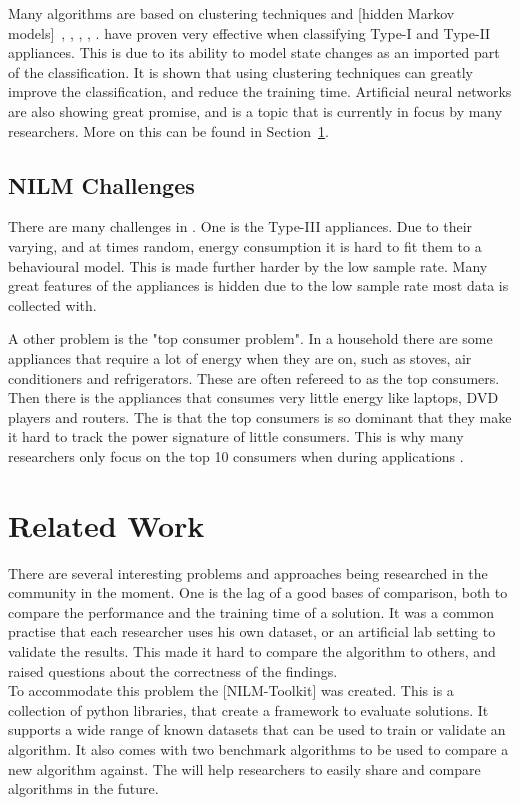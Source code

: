 Many algorithms are based on clustering techniques and [hidden Markov models]~\citep{RefWorks:28}, \citep{RefWorks:26}, \citep{RefWorks:23}, \citep{RefWorks:17}, \citep{RefWorks:24}.  have proven very effective when classifying Type-I and Type-II appliances. This is due to its ability to model state changes as an imported part of the classification. It is shown that using clustering techniques can greatly improve the classification, and reduce the training time. Artificial neural networks are also showing great promise, and is a topic that is currently in focus by many researchers. More on this can be found in Section~\ref{sec:RecRelatedwork}. 

\subsection{NILM Challenges} 
There are many challenges in . One is the Type-III appliances. Due to their varying, and at times random, energy consumption it is hard to fit them to a behavioural model. This is made further harder by the low sample rate. Many great features of the appliances is hidden due to the low sample rate most data is collected with\citep{RefWorks:17}.

A other problem is the "top consumer problem". In a household there are some appliances that require a lot of energy when they are on, such as stoves, air conditioners and refrigerators. These are often refereed to as the top consumers. Then there is the appliances that consumes very little energy like laptops, DVD players and routers. The  is that the top consumers is so dominant that they make it hard to track the power signature of little consumers. This is why many researchers only focus on the top 10 consumers when during  applications \citep{RefWorks:21}. 

\section{Related Work} 
\label{sec:RecRelatedwork}

There are several interesting problems and approaches being researched in the  community in the moment. One is the lag of a good bases of comparison, both to compare the performance and the training time of a solution. It was a common practise that each researcher uses his own dataset, or an artificial lab setting to validate the results. This made it hard to compare the algorithm to others, and raised questions about the correctness of the findings. \\
To accommodate this problem the [NILM-Toolkit] was created. This is a collection of python libraries, that create a framework to evaluate  solutions. It supports a wide range of known datasets that can be used to train or validate an algorithm. It also comes with two benchmark algorithms to be used to compare a new algorithm against. The  will help researchers to easily share and compare algorithms in the future\citep{RefWorks:21}. 

